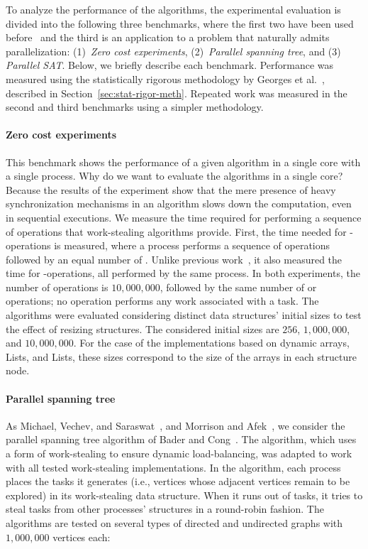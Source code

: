 To analyze the performance of the algorithms, the experimental evaluation is divided into the following three benchmarks, where the first two have been used before~\cite{DBLP_conf_pldi_FrigoLR98, maged.vechev.2009, MA14} and the third is an application to a problem that naturally admits parallelization: (1)~\textit{Zero cost experiments}, (2)~\textit{Parallel spanning tree}, and (3) \textit{Parallel SAT}. Below, we briefly describe each benchmark.  Performance was measured using the statistically rigorous methodology by Georges et al.~\cite{DBLP_conf_oopsla_GeorgesBE07}, described in Section~\ref{sec:stat-rigor-meth}.  Repeated work was measured in the second and third benchmarks using a simpler methodology.



\paragraph*{Zero cost experiments\label{zero-cost-experiment}}

This benchmark shows the performance of a given algorithm in a single core with a single process. Why do we want to evaluate the algorithms in a single core? Because the results of the experiment show that the mere presence of heavy synchronization mechanisms in an algorithm slows down the computation, even in sequential executions. We measure the time required for performing a sequence of operations that work-stealing algorithms provide. First, the time needed for \Put-\Take operations is measured, where a process performs a sequence of \Put operations followed by an equal number of \Takes. Unlike previous work~\cite{maged.vechev.2009, MA14}, it also measured the time for \Put-\Steal operations, all performed by the same process. In both experiments, the number of \Put operations is \(10,000,000\), followed by the same number of \Take or \Steal operations; no operation performs any work associated with a task. The algorithms were evaluated considering distinct data structures' initial sizes to test the effect of resizing structures. The considered initial sizes are \(256\), \(1,000,000\), and \(10,000,000\).  For the case of the implementations based on dynamic arrays, \NCWSM Lists, and \BNCWSM Lists, these sizes correspond to the size of the arrays in each structure node.

\paragraph*{Parallel spanning tree\label{irregular-graph}}
As Michael, Vechev, and Saraswat~\cite{maged.vechev.2009}, and Morrison and Afek~\cite{fencefreework}, we consider the parallel spanning tree algorithm of Bader and Cong~\cite{1302951}. The algorithm, which uses a form of work-stealing to ensure dynamic load-balancing, was adapted to work with all tested work-stealing implementations. In the algorithm, each process places the tasks it generates (i.e., vertices whose adjacent vertices remain to be explored) in its work-stealing data structure. When it runs out of tasks, it tries to steal tasks from other processes' structures in a round-robin fashion. The algorithms are tested on several types of directed and undirected graphs with $1,000,000$ vertices each:

